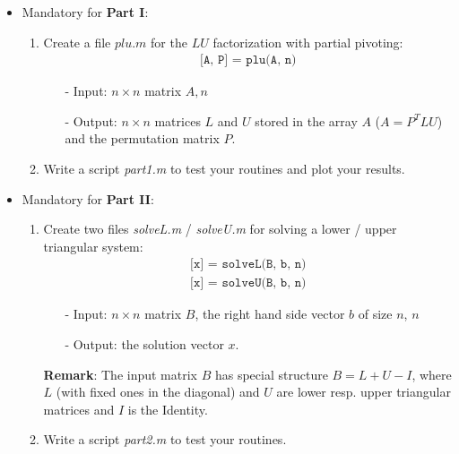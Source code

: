 \documentclass{scrartcl}
\begin{document}
\begin{enumerate}
\begin{itemize}
		\item Mandatory for \textbf{Part I}:
			\begin{enumerate}
				\item Create a file $plu.m$ for the $LU$ factorization with partial pivoting:
        		\begin{align*}        	 
        			\texttt{[A, P] = plu(A, n)}
				\end{align*}
        		\begin{itemize}
            		\item[-] Input: $n \times n$ matrix $A, n$
            		\item[-] Output: $n \times n$ matrices $L$ and $U$ stored in the array $A$ ($A=P^TLU$) and the permutation matrix $P$.
        		\end{itemize}
        		\item Write a script \textit{part1.m} to test your routines and plot your results.\\
        	\end{enumerate}

		\item Mandatory for \textbf{Part II}:
			\begin{enumerate}
				\item Create two files \textit{solveL.m} / \textit{solveU.m} for solving a lower / upper triangular system:
            	\begin{align*}
            		\texttt{[x] = solveL(B, b, n)}\\
					\texttt{[x] = solveU(B, b, n)}
				\end{align*}
        		\begin{itemize}
            		\item[-] Input: $n \times n$ matrix $B$, the right hand side vector $b$ of size $n$, $n$
            		\item[-] Output: the solution vector $x$.
        		\end{itemize}
		\textbf{Remark}: The input matrix $B$ has special structure $B = L + U - I$, where $L$ (with fixed ones in the diagonal) and $U$ are lower resp. upper triangular matrices and $I$ is the Identity.\\
				\item Write a script \textit{part2.m} to test your routines.\\
			\end{enumerate}


\end{itemize}
\end{enumerate}
\end{document}
